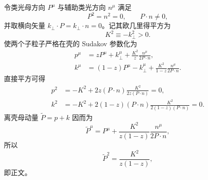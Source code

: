 \begin{derivation}[夸克共线发射的分裂概率]
令类光母方向 $P^\mu$ 与辅助类光方向 $n^\mu$ 满足
\begin{equation*}
 P^2=n^2=0,
 \qquad P\cdot n\neq0,
\end{equation*}
并取横向矢量 $k_\perp\cdot P=k_\perp\cdot n=0$。记其欧几里得平方为
\begin{equation*}
 K^2\equiv-k_\perp^2>0.
\end{equation*}
使两个子粒子严格在壳的 Sudakov 参数化为
\begin{align*}
 p^\mu
 &=zP^\mu+k_\perp^\mu
 +\frac{K^2}{z}\frac{n^\mu}{2P\cdot n},\\
 k^\mu
 &=(1-z)P^\mu-k_\perp^\mu
 +\frac{K^2}{1-z}\frac{n^\mu}{2P\cdot n}.
\end{align*}
直接平方可得
\begin{align*}
 p^2
 &=-K^2+2z(P\cdot n)\frac{K^2}{2z(P\cdot n)}=0,\\
 k^2
 &=-K^2+2(1-z)(P\cdot n)
 \frac{K^2}{2(1-z)(P\cdot n)}=0.
\end{align*}
离壳母动量 $\widetilde P=p+k$ 因而为
\begin{equation*}
 \widetilde P^\mu
 =P^\mu+\frac{K^2}{z(1-z)}\frac{n^\mu}{2P\cdot n},
\end{equation*}
所以
\begin{equation*}
 \widetilde P^2=\frac{K^2}{z(1-z)},
\end{equation*}
即正文。


\end{derivation}
